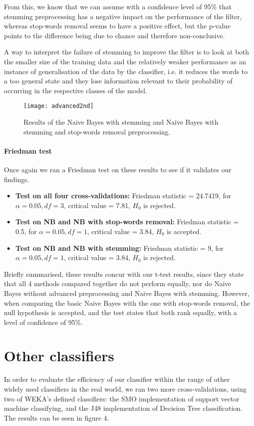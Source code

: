 \documentclass[12pt,a4paper]{report}
\begin{document}
From this, we know that we can assume with a confidence level of 95\% that stemming preprocessing has a negative impact on the performance of the filter, whereas stop-words removal seems to have a positive effect, but the p-value points to the difference being due to chance and therefore non-conclusive.

A way to interpret the failure of stemming to improve the filter is to look at both the smaller size of the training data and the relatively weaker performance as an instance of generalisation of the data by the classifier, i.e. it reduces the words to a too general state and they lose information relevant to their probability of occurring in the respective classes of the model.

\begin{figure}
\texttt{[image: advanced2nd]}
\centering
\caption{Results of the Naive Bayes with stemming and Naive Bayes with stemming and stop-words removal preprocessing.}
\end{figure}

\paragraph*{Friedman test}
Once again we ran a Friedman test on these results to see if it validates our findings.
\begin{itemize}
\item \textbf{Test on all four cross-validations:} Friedman statistic = 24.7419, for $ \alpha = 0.05, df = 3 $, critical value = 7.81, $ H_0 $ is rejected.
\item \textbf{Test on NB and NB with stop-words removal:} Friedman statistic = 0.5, for $ \alpha = 0.05, df = 1 $, critical value = 3.84, $ H_0 $ is accepted.
\item \textbf{Test on NB and NB with stemming:} Friedman statistic = 9, for $ \alpha = 0.05, df = 1 $, critical value = 3.84, $ H_0 $ is rejected.
\end{itemize}

Briefly summarised, these results concur with our t-test results, since they state that all 4 methods compared together do not perform equally, nor do Naive Bayes without advanced preprocessing and Naive Bayes with stemming. However, when comparing the basic Naive Bayes with the one with stop-words removal, the null hypothesis is accepted, and the test states that both rank equally, with a level of confidence of 95\%.

\section{Other classifiers}
In order to evaluate the efficiency of our classifier within the range of other widely used classifiers in the real world, we ran two more cross-validations, using two of WEKA's defined classifiers: the SMO implementation of support vector machine classifying, and the J48 implementation of Decision Tree classification. The results can be seen in figure 4.
\end{document}
